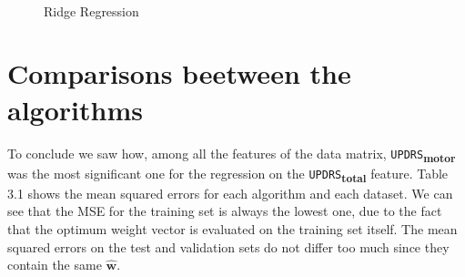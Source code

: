 \documentclass[12pt]{report}
\begin{document}
\begin{figure}[H]
\begin{center}
\\
\label{fig:rid}
\caption{Ridge Regression}
\end{center}
\end{figure}

\pagebreak

\chapter{ Comparisons beetween the algorithms}

To conclude we saw how, among all the features of the data matrix, \texttt{UPDRS}\textsubscript{\textbf{motor}} was the most significant one for the regression on the \texttt{UPDRS}\textsubscript{\textbf{total}} feature.
Table 3.1 shows the mean squared errors for each algorithm and each dataset. We can see that the MSE for the training set is always the lowest one, due to the fact that the optimum weight vector is evaluated on the training set itself. The mean squared errors on the test and validation sets do not differ too much since they contain the same $\hat{\textbf{w}}$.
\end{document}
